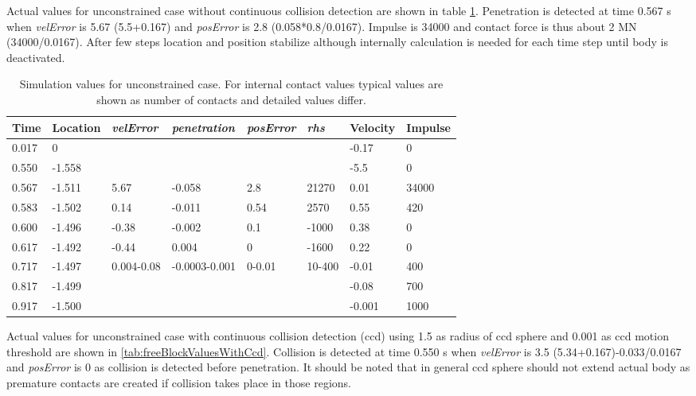 Actual values for unconstrained case without continuous collision detection
are shown in table \ref{tab:freeBlockValues}. Penetration is detected at time 0.567 s when
{\it velError} is 5.67 (5.5+0.167) and
{\it posError} is 2.8 (0.058*0.8/0.0167). Impulse is 34000 and contact force is thus about 2 MN (34000/0.0167).
After few steps location and position stabilize although internally calculation is needed for each time step
until body is deactivated.

\begin {table}[htb!]
\begin{center}
\begin{tabular}{|l| l|l| l|l|l|l|l|}
\hline
{\bf Time} & 
{\bf Location} &
{\it velError} & {\it penetration} & {\it posError} & {\it rhs} &
{\bf Velocity} & 
{\bf Impulse} \\  \hline
0.017 &  0 & & & &  &-0.17 & 0 \\  \hline
0.550 &  -1.558 & & & & & -5.5 & 0 \\  \hline
0.567 &  -1.511 & 5.67 &-0.058 &2.8 &  21270 & 0.01 & 34000 \\  \hline
0.583 &  -1.502 & 0.14 &-0.011 & 0.54& 2570  & 0.55 & 420 \\  \hline
0.600 &  -1.496 & -0.38&-0.002 & 0.1  & -1000& 0.38 & 0 \\  \hline
0.617 &  -1.492 &-0.44 & 0.004 & 0     & -1600& 0.22 & 0 \\  \hline
0.717 &  -1.497 &0.004-0.08  &-0.0003-0.001 &0-0.01 & 10-400 & -0.01 & 400 \\  \hline
0.817 &  -1.499 & & & & & -0.08 & 700 \\  \hline
0.917 &  -1.500 & & & & & -0.001 & 1000 \\  \hline
\end {tabular}
\end{center}
\caption {Simulation values for unconstrained case. 
For internal contact values typical values are shown
as number of contacts and detailed values differ.} 
\label{tab:freeBlockValues} 
\end {table}

Actual values for unconstrained case with continuous collision detection (ccd) using 1.5 
as radius of ccd sphere and 0.001 as ccd motion threshold
are shown in \ref{tab:freeBlockValuesWithCcd}. Collision is detected at time 0.550 s when
{\it velError} is  3.5 (5.34+0.167)-0.033/0.0167 and
{\it posError} is  0 as collision is detected before penetration. 
It should be noted that in general ccd sphere should not extend actual body as 
premature contacts are created if collision takes place in those regions.

